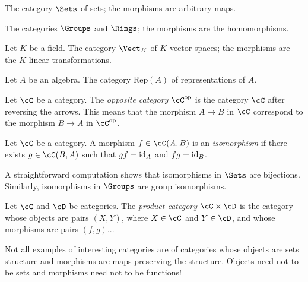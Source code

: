 \begin{example}
    The category $\Sets$ of sets; the morphisms are
    arbitrary maps. 
\end{example}

\begin{example}
    The categories $\Groups$ and 
    $\Rings$; the morphisms are the homomorphisms. 
\end{example}

\begin{example}
    Let $K$ be a field. The category $\Vect_K$ 
    of $K$-vector spaces; the morphisms are 
    the $K$-linear transformations. 
\end{example}

\begin{example}
    Let $A$ be an algebra. The category 
    $\mathrm{Rep}(A)$ of representations of $A$. 
\end{example}

\begin{example}
    Let $\cC$ be a category. The \emph{opposite category} $\cC^{\op}$ is the category 
    $\cC$ after reversing the arrows. This means
    that the morphism $A\to B$ in $\cC$ correspond
    to the morphism $B\to A$ in $\cC^{\op}$. 
\end{example}

\begin{definition}
    Let $\cC$ be a category. A morphism $f\in\cC(A,B)$ 
    is an \emph{isomorphism} if there exists 
    $g\in\cC(B,A)$ such that $gf=\operatorname{id}_A$ and 
    $fg=\operatorname{id}_B$. 
\end{definition}

A straightforward computation shows that 
isomorphisms in $\Sets$ are bijections. Similarly, 
isomorphisms in $\Groups$ are group isomorphisms. 

\begin{example}
    Let $\cC$ and $\cD$ be categories. 
    The \emph{product category} $\cC\times\cD$ 
    is the category whose objects
    are pairs $(X,Y)$, where $X\in\cC$ and $Y\in\cD$, 
    and whose morphisms 
    are pairs $(f,g)$...
\end{example}

Not all examples of interesting categories 
are of categories whose objects are sets structure
and morphisms are maps preserving the structure. Objects
need not to be sets and morphisms 
need not to be functions! 

